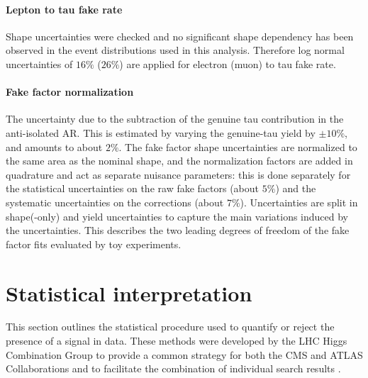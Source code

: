 \paragraph{Lepton to tau fake rate} Shape uncertainties were checked and no significant shape dependency has been observed in the event distributions used in this analysis. Therefore log normal uncertainties of $16\%$ ($26\%$) are applied for electron (muon) to tau fake rate.

\paragraph{Fake factor normalization} The uncertainty due to the subtraction of the genuine tau contribution in the anti-isolated AR. This is estimated by varying the genuine-tau yield by $\pm 10\%$, and amounts to about $2\%$. The fake factor shape uncertainties are normalized to the same area as the nominal shape, and the normalization factors are added in quadrature and act as separate nuisance parameters: this is done separately for the statistical uncertainties on the raw fake factors (about $5\%$) and the systematic uncertainties on the corrections (about $7\%$). Uncertainties are split in shape(-only) and yield uncertainties to capture the main variations induced by the uncertainties. This describes the two leading degrees of freedom of the fake factor \pt fits evaluated by toy experiments.

\section{Statistical interpretation}
\label{sec:analysis_statistical_interpretation}

This section outlines the statistical procedure used to quantify or reject the presence of a signal in data. These methods were developed by the LHC Higgs Combination Group to provide a common strategy for both the CMS and ATLAS Collaborations and to facilitate the combination of individual search results \cite{CMS-NOTE-2011-005}. 

